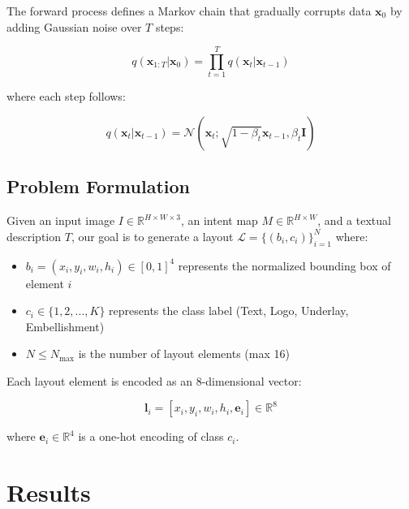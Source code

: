 \documentclass[journal,article,submit,pdftex,moreauthors]{Definitions/mdpi}
\begin{document}
The forward process defines a Markov chain that gradually corrupts data $\mathbf{x}_0$ by adding Gaussian noise over $T$ steps:
\begin{linenomath}
\begin{equation}
q(\mathbf{x}_{1:T} | \mathbf{x}_0) = \prod_{t=1}^{T} q(\mathbf{x}_t | \mathbf{x}_{t-1})
\end{equation}
\end{linenomath}

where each step follows:
\begin{linenomath}
\begin{equation}
q(\mathbf{x}_t | \mathbf{x}_{t-1}) = \mathcal{N}(\mathbf{x}_t; \sqrt{1-\beta_t}\mathbf{x}_{t-1}, \beta_t \mathbf{I})
\end{equation}
\end{linenomath}

\subsection{Problem Formulation}

Given an input image $I \in \mathbb{R}^{H \times W \times 3}$, an intent map $M \in \mathbb{R}^{H \times W}$, and a textual description $T$, our goal is to generate a layout $\mathcal{L} = \{(b_i, c_i)\}_{i=1}^{N}$ where:
\begin{itemize}
\item $b_i = (x_i, y_i, w_i, h_i) \in [0,1]^4$ represents the normalized bounding box of element $i$
\item $c_i \in \{1, 2, ..., K\}$ represents the class label (Text, Logo, Underlay, Embellishment)
\item $N \leq N_{\max}$ is the number of layout elements (max 16)
\end{itemize}

Each layout element is encoded as an 8-dimensional vector:
\begin{linenomath}
\begin{equation}
\mathbf{l}_i = [x_i, y_i, w_i, h_i, \mathbf{e}_i] \in \mathbb{R}^8
\end{equation}
\end{linenomath}

where $\mathbf{e}_i \in \mathbb{R}^4$ is a one-hot encoding of class $c_i$.

\section{Results}
\end{document}
